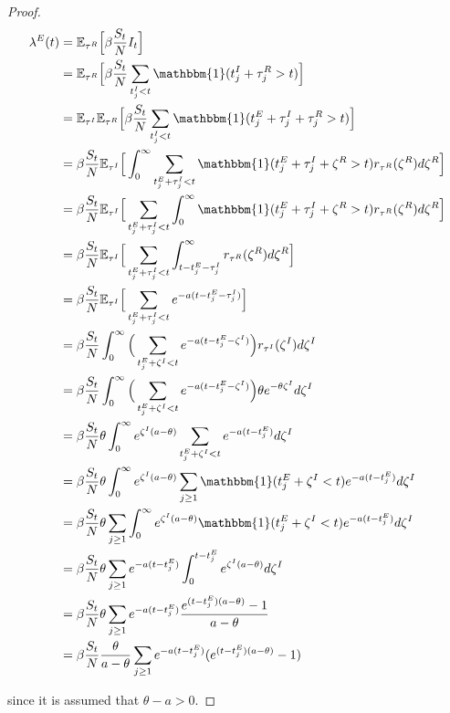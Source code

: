 \documentclass[12pt]{article}
\begin{document}
\begin{proof}
\begin{align*}
  \lambda^{E}(t) &= \mathbb{E}_{\tau^R} \Big [ \beta \frac{S_t}{N} I_t  \Big ] \\
  &= \mathbb{E}_{\tau^R} \Big [ \beta \frac{S_t}{N}  \sum_{t_j^I < t} \mathbbm{1} (t_j^I + \tau_j^R > t)  \Big ] \\
  &=  \mathbb{E}_{\tau^I} \mathbb{E}_{\tau^R} \Big [ \beta \frac{S_t}{N}  \sum_{t_j^I < t} \mathbbm{1} (t_j^E + \tau_j^I + \tau_j^R > t)  \Big ] \\
  &= \beta \frac{S_t}{N} \mathbb{E}_{\tau^I} \Big [ \int_0^\infty  \sum_{t_j^E + \tau_j^I < t} \mathbbm{1} (t_j^E + \tau_j^I + \zeta^R > t) r_{\tau^R}(\zeta^R) d \zeta^R  \Big ] \\
  &= \beta \frac{S_t}{N} \mathbb{E}_{\tau^I}  \Big [ \sum_{t_j^E + \tau_j^I < t} \int_0^\infty  \mathbbm{1} (t_j^E + \tau_j^I + \zeta^R > t) r_{\tau^R}(\zeta^R) d \zeta^R  \Big ] \\
  &= \beta \frac{S_t}{N} \mathbb{E}_{\tau^I}  \Big [ \sum_{t_j^E + \tau_j^I < t} \int_{t - t_j^E - \tau_j^I}^\infty r_{\tau^R}(\zeta^R) d \zeta^R  \Big ] \\
  &= \beta \frac{S_t}{N} \mathbb{E}_{\tau^I}  \Big [ \sum_{t_j^E + \tau_j^I < t} e^{-a(t-t_j^E-\tau_j^I)}  \Big ] \\
  &= \beta \frac{S_t}{N} \int_0^\infty \Big (  \sum_{t_j^E + \zeta^I < t} e^{-a(t-t_j^E-\zeta^I)}  \Big ) r_{\tau^I} (\zeta^I) d\zeta^I \\
  &= \beta \frac{S_t}{N} \int_0^\infty \Big (  \sum_{t_j^E + \zeta^I < t} e^{-a(t-t_j^E-\zeta^I)}  \Big ) \theta e^{-\theta \zeta^I} d\zeta^I \\
  &= \beta \frac{S_t}{N}  \theta \int_0^\infty e^{\zeta^I(a-\theta)} \sum_{t_j^E + \zeta^I < t} e^{-a(t-t_j^E)}   d \zeta^I \\
  &= \beta \frac{S_t}{N}  \theta \int_0^\infty e^{\zeta^I(a-\theta)} \sum_{j \geq 1} \mathbbm{1} (t_j^E + \zeta^I < t) e^{-a(t-t_j^E)}   d \zeta^I \\
  &= \beta \frac{S_t}{N}  \theta \sum_{j \geq 1} \int_0^\infty e^{\zeta^I(a-\theta)}  \mathbbm{1} (t_j^E + \zeta^I < t) e^{-a(t-t_j^E)}   d \zeta^I \\
  &= \beta \frac{S_t}{N}  \theta \sum_{j \geq 1}  e^{-a(t-t_j^E)}  \int_0^{t-t_j^E} e^{\zeta^I(a-\theta)}  d  \zeta^I \\
  &= \beta \frac{S_t}{N}  \theta \sum_{j \geq 1}  e^{-a(t-t_j^E)}  \frac{e^{(t-t_j^E)(a - \theta)} - 1}{a - \theta}\\
  &= \beta  \frac{S_t}{N} \frac{\theta }{a - \theta } \sum_{j \geq 1}e^{-a(t-t_j^E)}  (e^{(t-t_j^E)(a - \theta)} - 1) \\
\end{align*}

since it is assumed that $\theta - a > 0$.

\end{proof}
\end{document}
